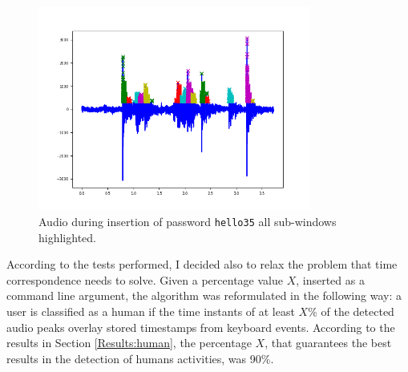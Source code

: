\begin{figure}[h]
     \centering
	 \includegraphics[width=0.8\textwidth]{Images/AcCAPPCHA/hello35_time}
     \caption{\footnotesize{Audio during insertion of password \texttt{hello35} all sub-windows highlighted.}}\label{AcCAPPCHA:hello35_time}
\end{figure}
According to the tests performed, I decided also to relax the problem that time correspondence needs to solve. Given a percentage value $X$, inserted as a command line argument, the algorithm was reformulated in the following way: a user is classified as a human if the time instants of at least $X$\% of the detected audio peaks overlay stored timestamps from keyboard events. According to the results in Section \ref{Results:human}, the percentage $X$, that guarantees the best results in the detection of humans activities, was 90\%.

